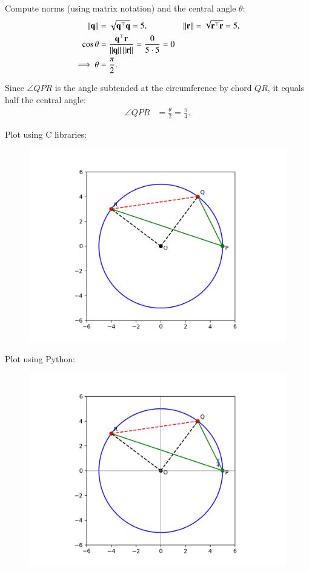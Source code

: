 \documentclass[journal,12pt,onecolumn]{IEEEtran}
\begin{document}
Compute norms (using matrix notation) and the central angle $\theta$:
\begin{align}
\left\lVert\mathbf{q}\right\rVert &= \sqrt{\mathbf{q}^\top\mathbf{q}} = 5, & 
\left\lVert\mathbf{r}\right\rVert &= \sqrt{\mathbf{r}^\top\mathbf{r}} = 5, \\
\cos\theta &= \dfrac{\mathbf{q}^\top\mathbf{r}}{\left\lVert\mathbf{q}\right\rVert\left\lVert\mathbf{r}\right\rVert}
= \dfrac{0}{5\cdot 5} = 0 \\
\implies \theta &= \frac{\pi}{2}.
\end{align}

Since $\angle QPR$ is the angle subtended at the circumference by chord $QR$, it equals half the central angle:
\begin{align}
\angle QPR &= \frac{\theta}{2} = \frac{\pi}{4}.
\end{align}


Plot using C libraries:
\begin{figure}[H]
	\centering
	\includegraphics[scale=0.5]{img1}
	\caption*{}
	\label{img1}
\end{figure}
Plot using Python:
\begin{figure}[H]
	\centering
	\includegraphics[scale=0.5]{img2}
	\caption*{}
	\label{img2}
\end{figure}
\end{document}
